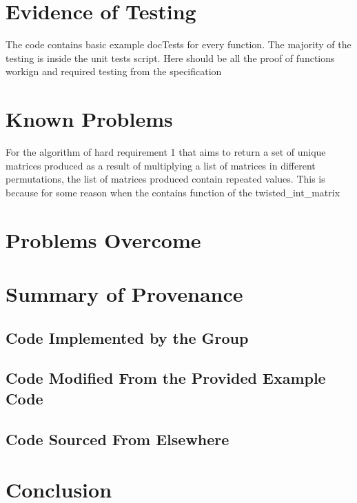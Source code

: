 \documentclass[11]{article}
\begin{document}
	\section{Evidence of Testing}	
		The code contains basic example docTests for every function. The majority of the testing is inside the unit tests script. Here should be all the proof of functions workign and required testing from the specification
		
	\section{Known Problems}
		For the algorithm of hard requirement 1 that aims to return a set of unique matrices produced as a result of multiplying a list of matrices in different permutations, the list of matrices produced contain repeated values. This is because for some reason when the contains function of the twisted\_int\_matrix 
		
	\section{Problems Overcome}

	\section{Summary of Provenance}
			\subsection{Code Implemented by the Group} 

			\subsection{Code Modified From the Provided Example Code}

			\subsection{Code Sourced From Elsewhere}
				
	
\section{Conclusion}
\end{document}
